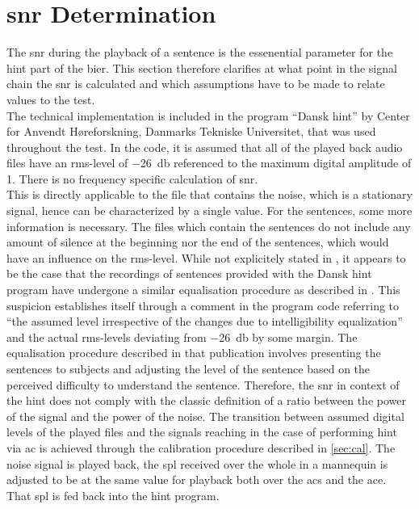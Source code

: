 \section{\gls{snr} Determination}\label{sec:snr_det}
The \gls{snr} during the playback of a sentence is the essenential parameter for the \gls{hint} part of the \gls{bier}.
This section therefore clarifies at what point in the signal chain the \gls{snr} is calculated and which assumptions have to be made to relate values to the test.\\
The technical implementation is included in the \matlab program \enquote{Dansk \gls{hint}} by Center for Anvendt Høreforskning, Danmarks Tekniske Universitet, that was used throughout the test.
In the code, it is assumed that all of the played back audio files have an \gls{rms}-level of \SI{-26}{\decibel} referenced to the maximum digital amplitude of 1. There is no frequency specific calculation of \gls{snr}.\\
This is directly applicable to the file that contains the noise, which is a stationary signal, hence can be characterized by a single value.
For the sentences, some more information is necessary. The files which contain the sentences do not include any amount of silence at the beginning nor the end of the sentences, which would have an influence on the \gls{rms}-level.
While not explicitely stated in \citep{hint_2011}, it appears to be the case that the recordings of sentences provided with the Dansk \gls{hint} program have undergone a similar equalisation procedure as described in \citep{nielsen_dau_09}. 
This suspicion establishes itself through a comment in the program code referring to \enquote{the assumed level irrespective of the changes due to intelligibility equalization} and the actual \gls{rms}-levels deviating from \SI{-26}{\decibel} by some margin.
The equalisation procedure described in that publication involves presenting the sentences to subjects and adjusting the level of the sentence based on the perceived difficulty to understand the sentence.
Therefore, the \gls{snr} in context of the \gls{hint} does not comply with the classic definition of a ratio between the power of the signal and the power of the noise.
The transition between assumed digital levels of the played files and the signals reaching in the case of performing \gls{hint} via \gls{ac} is achieved through the calibration procedure described in \autoref{sec:cal}. The noise signal is played back, the \gls{spl} received over the whole in a mannequin is adjusted  to be at the same value for playback both over the \gls{acs} and the \gls{ace}. That \gls{spl} is fed back into the \gls{hint} \matlab program.
